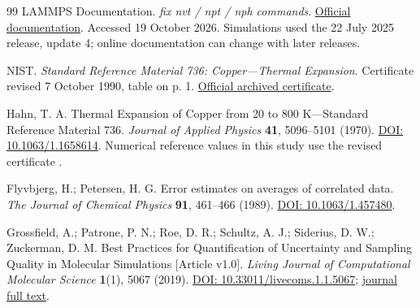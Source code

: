 \documentclass[10pt,a4paper,twocolumn]{article}
\begin{document}
\begin{thebibliography}{99}
 LAMMPS Documentation. \emph{fix nvt / npt / nph commands}. \href{https://docs.lammps.org/fix_nh.html}{Official documentation}. Accessed 19 October 2026. Simulations used the 22 July 2025 release, update 4; online documentation can change with later releases.

 NIST. \emph{Standard Reference Material 736: Copper—Thermal Expansion}. Certificate revised 7 October 1990, table on p. 1. \href{https://tsapps.nist.gov/srmext/certificates/archives/736.pdf}{Official archived certificate}.

 Hahn, T. A. Thermal Expansion of Copper from 20 to 800 K—Standard Reference Material 736. \emph{Journal of Applied Physics} \textbf{41}, 5096–5101 (1970). \href{https://doi.org/10.1063/1.1658614}{DOI: 10.1063/1.1658614}. Numerical reference values in this study use the revised certificate \cite{r9}.

 Flyvbjerg, H.; Petersen, H. G. Error estimates on averages of correlated data. \emph{The Journal of Chemical Physics} \textbf{91}, 461–466 (1989). \href{https://doi.org/10.1063/1.457480}{DOI: 10.1063/1.457480}.

 Grossfield, A.; Patrone, P. N.; Roe, D. R.; Schultz, A. J.; Siderius, D. W.; Zuckerman, D. M. Best Practices for Quantification of Uncertainty and Sampling Quality in Molecular Simulations [Article v1.0]. \emph{Living Journal of Computational Molecular Science} \textbf{1}(1), 5067 (2019). \href{https://doi.org/10.33011/livecoms.1.1.5067}{DOI: 10.33011/livecoms.1.1.5067}; \href{https://livecomsjournal.org/index.php/livecoms/article/download/v1i1e5067/913/2595}{journal full text}.
\end{thebibliography}
\end{document}
